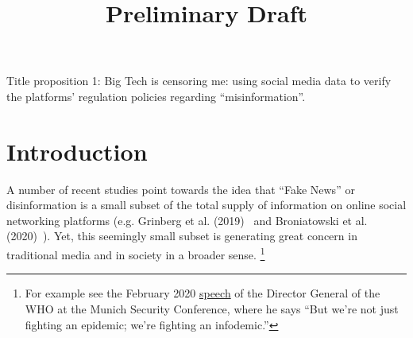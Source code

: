 \documentclass{article}
\begin{document}
\title{Preliminary Draft}

\maketitle

Title proposition 1: Big Tech is censoring me: using social media data to verify the platforms' regulation policies regarding ``misinformation''. 

\section{Introduction}

A number of recent studies  point towards the idea that ``Fake News'' or disinformation is a small subset of the total supply of information on online social networking platforms (e.g. Grinberg et al. (2019)~\cite{grinberg} and Broniatowski et al. (2020)~\cite{broniatowski}). Yet, this seemingly small subset is generating great concern in traditional media and in society in a broader sense. \footnote{For example see the February 2020 \href{https://www.who.int/director-general/speeches/detail/munich-security-conference}{speech} of the Director General of the WHO at the Munich Security Conference, where he says ``But we’re not just fighting an epidemic; we’re fighting an infodemic.''  }
\end{document}
